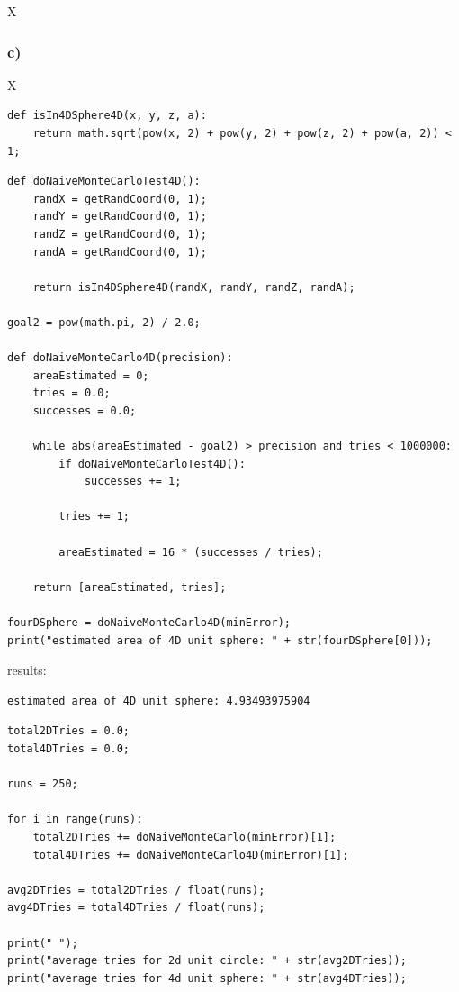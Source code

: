 X



\subsubsection{c)}

X

\begin{lstlisting}[caption=todo]
def isIn4DSphere4D(x, y, z, a):
	return math.sqrt(pow(x, 2) + pow(y, 2) + pow(z, 2) + pow(a, 2)) < 1;
\end{lstlisting}

\begin{lstlisting}[caption=todo]
def doNaiveMonteCarloTest4D():
	randX = getRandCoord(0, 1);
	randY = getRandCoord(0, 1);
	randZ = getRandCoord(0, 1);
	randA = getRandCoord(0, 1);
	
	return isIn4DSphere4D(randX, randY, randZ, randA);

goal2 = pow(math.pi, 2) / 2.0;

def doNaiveMonteCarlo4D(precision):
	areaEstimated = 0;
	tries = 0.0;
	successes = 0.0;

	while abs(areaEstimated - goal2) > precision and tries < 1000000:
		if doNaiveMonteCarloTest4D():
			successes += 1;
		
		tries += 1;
		
		areaEstimated = 16 * (successes / tries);
	
	return [areaEstimated, tries];

fourDSphere = doNaiveMonteCarlo4D(minError);
print("estimated area of 4D unit sphere: " + str(fourDSphere[0]));
\end{lstlisting}

results:

\begin{lstlisting}[caption=Result of 1.1 a), keywordstyle=\color{black}]
estimated area of 4D unit sphere: 4.93493975904
\end{lstlisting}


\begin{lstlisting}[caption=todo]
total2DTries = 0.0;
total4DTries = 0.0;

runs = 250;

for i in range(runs):
	total2DTries += doNaiveMonteCarlo(minError)[1];
	total4DTries += doNaiveMonteCarlo4D(minError)[1];

avg2DTries = total2DTries / float(runs);
avg4DTries = total4DTries / float(runs);

print(" ");
print("average tries for 2d unit circle: " + str(avg2DTries));
print("average tries for 4d unit sphere: " + str(avg4DTries));
\end{lstlisting}

